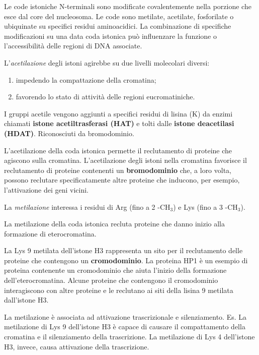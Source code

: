 \documentclass[11pt]{book}
\begin{document}
Le code istoniche N-terminali sono modificate covalentemente nella
porzione che esce dal core del nucleosoma. Le code sono metilate,
acetilate, fosforilate o ubiquinate su specifici residui aminoacidici.
La combinazione di specifiche modificazioni su una data coda istonica
può influenzare la funzione o l'accessibilità delle regioni di DNA
associate.

L'\emph{acetilazione} degli istoni agirebbe su due livelli molecolari
diversi:

\begin{enumerate}
\def\labelenumi{\arabic{enumi}.}
\itemsep1pt\parskip0pt
\item
  impedendo la compattazione della cromatina;
\item
  favorendo lo stato di attività delle regioni eucromatiniche.
\end{enumerate}

I gruppi acetile vengono aggiunti a specifici residui di lisina (K) da
enzimi chiamati \textbf{istone acetiltrasferasi (HAT)} e tolti dalle
\textbf{istone deacetilasi (HDAT)}. Riconosciuti da bromodominio.

L'acetilazione della coda istonica permette il reclutamento di proteine
che agiscono sulla cromatina. L'acetilazione degli istoni nella
cromatina favorisce il reclutamento di proteine contenenti un
\textbf{bromodominio} che, a loro volta, possono reclutare
specificatamente altre proteine che inducono, per esempio, l'attivazione
dei geni vicini.

La \emph{metilazione} interessa i residui di Arg (fino a 2 -CH\(_3\)) e
Lys (fino a 3 -CH\(_3\)).

La metilazione della coda istonica recluta proteine che danno inizio
alla formazione di eterocromatina.

La Lys 9 metilata dell'istone H3 rappresenta un sito per il reclutamento
delle proteine che contengono un \textbf{cromodominio}. La proteina HP1
è un esempio di proteina contenente un cromodominio che aiuta l'inizio
della formazione dell'eterocromatina. Alcune proteine che contengono il
cromodominio interagiscono con altre proteine e le reclutano ai siti
della lisina 9 metilata dall'istone H3.

La metilazione è associata ad attivazione trascrizionale e
silenziamento. Es. La metilazione di Lys 9 dell'istone H3 è capace di
causare il compattamento della cromatina e il silenziamento della
trascrizione. La metilazione di Lys 4 dell'istone H3, invece, causa
attivazione della trascrizione.
\end{document}
